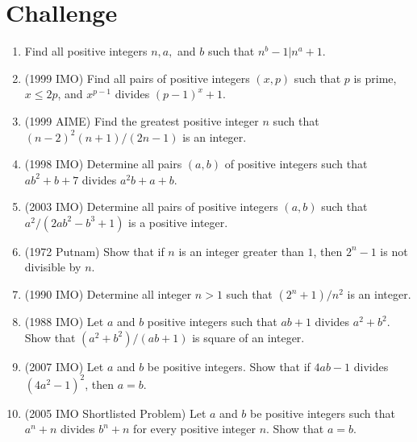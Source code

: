 \documentclass[11pt]{scrartcl}
\begin{document}
\section{Challenge}
\begin{enumerate}[resume]
    \item Find all positive integers $n, a,$ and $b$ such that $n^{b}-1 | n^a+1$.
    
    \item (1999 IMO) Find all pairs of positive integers $(x,p)$ such that $p$ is prime, $x \le 2p$, and $x^{p-1}$ divides $(p-1)^x+1$.
    
    \item (1999 AIME) Find the greatest positive integer $n$ such that $(n-2)^2(n+1)/(2n-1)$ is an integer.
    
    \item (1998 IMO) Determine all pairs $(a,b)$ of positive integers such that $ab^2+b+7$ divides $a^2b+a+b$.
    
    \item (2003 IMO) Determine all pairs of positive integers $(a,b)$ such that $a^2 / (2ab^2-b^3+1)$ is a positive integer.
    
    \item (1972 Putnam) Show that if $n$ is an integer greater than $1$, then $2^n-1$ is not divisible by $n$.
    
    \item (1990 IMO) Determine all integer $n>1$ such that $(2^n+1)/n^2$ is an integer.
    
    \item (1988 IMO) Let $a$ and $b$ positive integers such that $ab+1$ divides $a^2+b^2$. Show that $(a^2+b^2)/(ab+1)$ is square of an integer.
    
    \item (2007 IMO) Let $a$ and $b$ be positive integers. Show that if $4ab-1$ divides $(4a^2-1)^2$, then $a=b$.
    
    \item (2005 IMO Shortlisted Problem) Let $a$ and $b$ be positive integers such that $a^n+n$ divides $b^n+n$ for every positive integer $n$. Show that $a=b$.


    

\end{enumerate}
\end{document}
